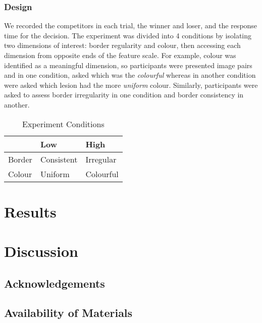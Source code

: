 \documentclass[a4paper, natbib, doc, 12pt]{apa7}
\begin{document}
\subsubsection{Design}
We recorded the competitors in each trial, the winner and loser, and the response time for the decision. The experiment was divided into 4 conditions by isolating two dimensions of interest: border regularity and colour, then accessing each dimension from opposite ends of the feature scale. For example, colour was identified as a meaningful dimension, so participants were presented image pairs and in one condition, asked which was the \textit{colourful} whereas in another condition were asked which lesion had the more \textit{uniform} colour. Similarly, participants were asked to assess border irregularity in one condition and border consistency in another.
\begin{table}[!htp]
\centering
\caption{Experiment Conditions}
\begin{tabular}{lll}
 & Low & High \\ \hline
\multicolumn{1}{l|}{Border} & Consistent & Irregular \\
\multicolumn{1}{l|}{Colour} & Uniform & Colourful
\end{tabular}
\end{table}

\section{Results}
\section{Discussion}

\subsection*{Acknowledgements}
\subsection*{Availability of Materials}
\newpage

\end{document}
